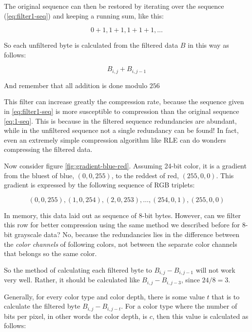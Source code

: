 The original sequence can then be restored by iterating over the
sequence (\ref{eq:filter1-seq}) and keeping a running sum, like this:

\begin{equation*}
  0+1,1+1,1+1+1,\dots
\end{equation*}

So each unfiltered byte is calculated from the filtered data $B$ in
this way as follows:

\begin{equation*}
  B_{i,j} + B_{i,j-1}
\end{equation*}

And remember that all addition is done modulo $256$

This filter can increase greatly the compression rate, because the
sequence given in \ref{eq:filter1-seq} is more susceptible to
compression than the original sequence \ref{eq:1-seq}. This is because
in the filtered sequence redundancies are abundant, while in the
unfiltered sequence not a single redundancy can be found! In fact,
even an extremely simple compression algorithm like RLE can do wonders
compressing the filtered data.

Now consider figure \ref{fig:gradient-blue-red}. Assuming 24-bit
color, it is a gradient from the bluest of blue, $(0,0,255)$, to the
reddest of red, $(255,0,0)$. This gradient is expressed by the
following sequence of RGB triplets:

\begin{equation*}
  (0,0,255), (1,0,254), (2,0,253), \dots, (254,0,1), (255,0,0)
\end{equation*}

In memory, this data laid out as sequence of 8-bit bytes. However, can
we filter this row for better compression using the same method we
described before for 8-bit grayscale data? No, because the
redundancies lies in the difference between the \textit{color
  channels} of following colors, not between the separate color
channels that belongs so the same color.

So the method of calculating each filtered byte to $B_{i,j} -
B_{i,j-1}$ will not work very well. Rather, it should be calculated
like $B_{i,j} - B_{i,j-3}$, since $24 / 8 = 3$.

Generally, for every color type and color depth, there is some value $t$ that is to
calculate the filtered byte $B_{i,j} - B_{i,j-t}$. For a color type
where the number of bits per pixel, in other words the color depth, is
$c$, then this value is calculated as follows:


